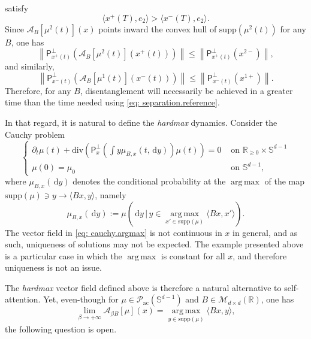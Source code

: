 \documentclass[a4paper,11pt]{article}
\theoremstyle{plain}
\newcommand{\supp}{\mathrm{supp}}
\newcommand{\argmax}{\mathop{\mathrm{arg\,max}}\limits}
\newcommand{\R}{\mathbb{R}}
\newcommand{\proj}{\bm{\mathsf{P}}^\perp}
\newcommand{\diff}{\, \mathrm{d}}
\newcommand{\dive}{\mathrm{div}}
\renewcommand{\S}{\mathbb{S}^{d-1}}
\newcommand{\bB}{\bm{\mathit{B}}}
\renewcommand{\leq}{\leqslant}
\renewcommand{\geq}{\geqslant}
\numberwithin{equation}{section}
\begin{document}
satisfy
\begin{equation*}
    \langle x^{+}(T),e_2\rangle >\langle x^{-}(T),e_2\rangle.
\end{equation*}
Since $\mathscr{A}_{\bB}[\mu^2(t)](x)$ points inward the convex hull of $\supp(\mu^2(t))$ for any $\bB$, one has
\begin{equation*}
    \left\|\proj_{x^{+}(t)}\left(\mathscr{A}_{\bB}[\mu^2(t)](x^{+}(t))\right)\right\|\leq \left\|\proj_{x^+(t)}(x^{2-})\right\|,
\end{equation*}
and similarly,
\begin{equation*}
    \left\|\proj_{x^{-}(t)}\left(\mathscr{A}_{\bB}[\mu^1(t)](x^{-}(t))\right)\right\|\leq\left\|\proj_{x^-(t)}(x^{1+})\right\|.
\end{equation*}
Therefore, for any $\bB$, disentanglement will necessarily be achieved in a greater time than the time needed using \eqref{eq: separation.reference}. 



In that regard, it is natural to define the \emph{hardmax} dynamics. Consider the Cauchy problem
\begin{equation} \label{eq: cauchy.argmax}
\begin{cases}
\partial_t\mu(t)+\dive\left(\proj_x\left(\displaystyle\int y \mu_{\bB,x}(t, \diff y)\right)\mu(t)\right)=0 &\text{ on } \mathbb{R}_{\geq0}\times\S\\
\mu(0)=\mu_0 &\text{ on } \S,
\end{cases}
\end{equation}
where $\mu_{\bB,x}(\diff y)$ denotes the conditional probability at the $\argmax$ of the map $\supp(\mu)\ni y\to \langle \bB x,y\rangle$, namely
\begin{equation*}
    \mu_{\bB,x}(\diff y):=\mu\left( \diff y \,\bigg|\, y\in \argmax_{x'\in \supp(\mu)} \langle \bB x, x'\rangle\right).
\end{equation*}
The vector field in \eqref{eq: cauchy.argmax} is not continuous in $x$ in general, and as such, uniqueness of solutions may not be expected. The example presented above is a particular case in which the $\argmax$ is constant for all $x$, and therefore uniqueness is not an issue.

The \emph{hardmax} vector field defined above is therefore a natural alternative to self-attention. Yet, even-though for $\mu\in\mathscr{P}_{\text{ac}}(\S)$ and $\bB\in\mathscr{M}_{d\times d}(\R)$, one has
\begin{equation*}
    \lim_{\beta\to+\infty}\mathscr{A}_{\beta \bB}[\mu](x)=\argmax_{y\in \supp(\mu)}\langle \bB x,y\rangle,
\end{equation*}
the following question is open.
\end{document}
